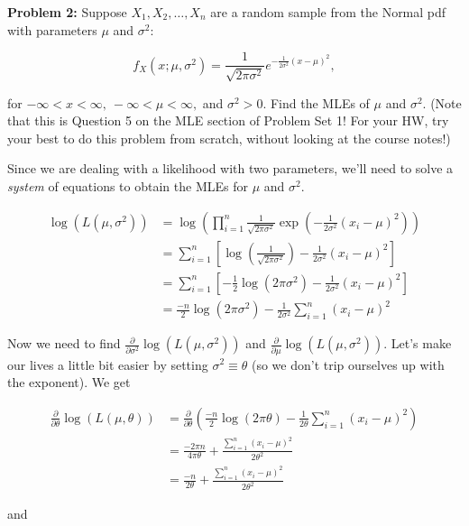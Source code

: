 \documentclass[
  letterpaper,
  DIV=11,
  numbers=noendperiod]{scrreprt}
\begin{document}
\textbf{Problem 2:} Suppose \(X_1, X_2, \dots, X_n\) are a random sample
from the Normal pdf with parameters \(\mu\) and \(\sigma^2\):

\[
f_X(x ; \mu, \sigma^2) = \frac{1}{\sqrt{2\pi\sigma^2}}e^{-\frac{1}{2\sigma^2}(x-\mu)^2},
\]

for \(-\infty < x < \infty, \ -\infty < \mu < \infty,\) and
\(\sigma^2 > 0\). Find the MLEs of \(\mu\) and \(\sigma^2\). (Note that
this is Question 5 on the MLE section of Problem Set 1! For your HW, try
your best to do this problem from scratch, without looking at the course
notes!)

Since we are dealing with a likelihood with two parameters, we'll need
to solve a \emph{system} of equations to obtain the MLEs for \(\mu\) and
\(\sigma^2\).

\begin{align*}
    \log(L(\mu, \sigma^2)) & = \log( \prod_{i = 1}^n \frac{1}{\sqrt{2\pi\sigma^2}} \exp(-\frac{1}{2\sigma^2} (x_i - \mu)^2) ) \\
    & = \sum_{i = 1}^n \left[ \log(\frac{1}{\sqrt{2\pi \sigma^2}})  - \frac{1}{2\sigma^2} (x_i - \mu)^2 \right] \\
    & = \sum_{i = 1}^n \left[ -\frac{1}{2} \log(2 \pi \sigma^2) - \frac{1}{2\sigma^2} (x_i - \mu)^2 \right] \\
    & = \frac{-n}{2} \log(2\pi \sigma^2) - \frac{1}{2\sigma^2} \sum_{i = 1}^n (x_i - \mu)^2
\end{align*}

Now we need to find
\(\frac{\partial}{\partial \sigma^2}\log(L(\mu, \sigma^2))\) and
\(\frac{\partial}{\partial \mu}\log(L(\mu, \sigma^2))\). Let's make our
lives a little bit easier by setting \(\sigma^2 \equiv \theta\) (so we
don't trip ourselves up with the exponent). We get

\begin{align*}
    \frac{\partial}{\partial \theta}\log(L(\mu, \theta)) & = \frac{\partial}{\partial \theta} \left(\frac{-n}{2} \log(2\pi \theta) - \frac{1}{2\theta} \sum_{i = 1}^n (x_i - \mu)^2 \right)\\
    & = \frac{-2\pi n}{4 \pi \theta} + \frac{\sum_{i = 1}^n (x_i - \mu)^2 }{2 \theta^2} \\
    & = \frac{-n}{2 \theta} + \frac{\sum_{i = 1}^n (x_i - \mu)^2 }{2 \theta^2}
\end{align*}

and
\end{document}
